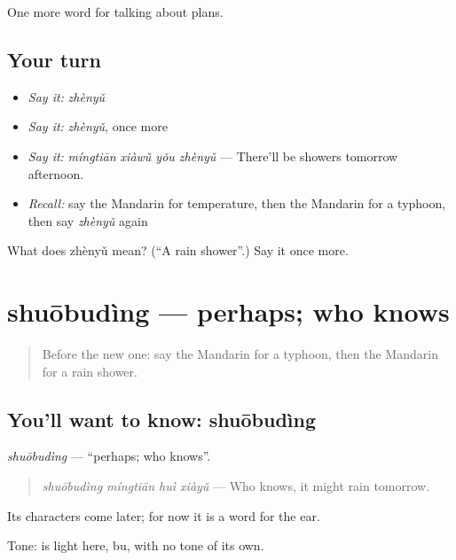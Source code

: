 \begin{grammarlens}[title={What you've built}]
One more word for talking about plans.
\end{grammarlens}

\subsection*{Your turn}
\begin{itemize}
\raggedright
  \item \emph{Say it:} \emph{zhènyǔ}
  \item \emph{Say it:} \emph{zhènyǔ}, once more
  \item \emph{Say it:} \emph{míngtiān xiàwǔ yǒu zhènyǔ} — There'll be showers tomorrow afternoon.
  \item \emph{Recall:} say the Mandarin for temperature, then the Mandarin for a typhoon, then say \emph{zhènyǔ} again
\end{itemize}

\begin{tcolorbox}[breakable,colback=teal!4,colframe=teal!35!black,title={Before you move on}]
What does zhènyǔ mean? (\textquotedblleft{}A rain shower\textquotedblright{}.) Say it once more.
\end{tcolorbox}
\section[shuōbudìng]{shuōbudìng — perhaps; who knows}

\label{lesson:ZH-C244-shuobuding}



\begin{quote}
Before the new one: say the Mandarin for a typhoon, then the Mandarin for a rain shower.
\end{quote}

\subsection*{You'll want to know: shuōbudìng}
\emph{shuōbudìng} — \textquotedblleft{}perhaps; who knows\textquotedblright{}.

\begin{quote}
\emph{shuōbudìng míngtiān huì xiàyǔ} — Who knows, it might rain tomorrow.
\end{quote}

Its characters come later; for now it is a word for the ear.

Tone:  is light here, bu, with no tone of its own.

